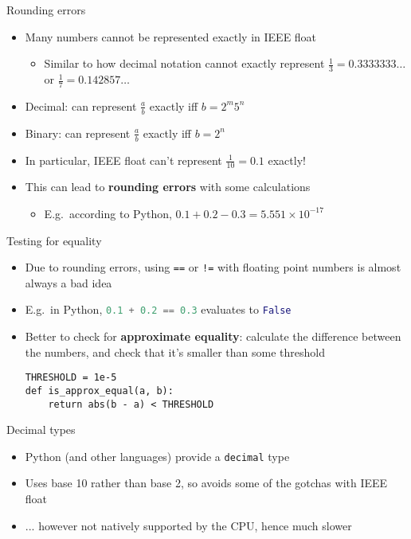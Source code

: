 \begin{frame}{Rounding errors}
	\begin{itemize}
		\pause\item Many numbers cannot be represented exactly in IEEE float
			\begin{itemize}
				\pause\item Similar to how decimal notation cannot exactly represent
					$\frac13 = 0.3333333\dots$ or $\frac17 = 0.142857\dots$
			\end{itemize}
		\pause\item Decimal: can represent $\frac{a}{b}$ exactly iff $b = 2^m 5^n$
		\pause\item Binary: can represent $\frac{a}{b}$ exactly iff $b = 2^n$
		\pause\item In particular, IEEE float can't represent $\frac{1}{10} = 0.1$ exactly!
		\pause\item This can lead to \textbf{rounding errors} with some calculations
			\begin{itemize}
				\pause\item E.g.\ according to Python,
					$0.1 + 0.2 - 0.3 = 5.551 \times 10^{-17}$
			\end{itemize}
	\end{itemize}
\end{frame}

\begin{frame}[fragile]{Testing for equality}
	\begin{itemize}
		\pause\item Due to rounding errors, using \lstinline{==} or \lstinline{!=} with floating point numbers is almost always a bad idea
		\pause\item E.g.\ in Python, \lstinline[language=Python]{0.1 + 0.2 == 0.3} evaluates to \lstinline[language=Python]{False}
		\pause\item Better to check for \textbf{approximate equality}: calculate the difference between the numbers,
			and check that it's smaller than some threshold
		\pause
		\begin{lstlisting}
THRESHOLD = 1e-5
def is_approx_equal(a, b):
    return abs(b - a) < THRESHOLD
		\end{lstlisting}
	\end{itemize}
\end{frame}

\begin{frame}{Decimal types}
	\begin{itemize}
		\pause\item Python (and other languages) provide a \lstinline{decimal} type
		\pause\item Uses base 10 rather than base 2, so avoids some of the gotchas with IEEE float
		\pause\item ... however not natively supported by the CPU, hence much slower
	\end{itemize}
\end{frame}
